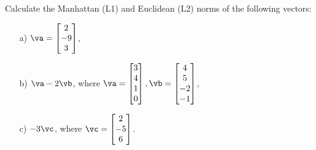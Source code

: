 \newpage

\begin{problem}[2 point]
    Calculate the Manhattan (L1) and Euclidean (L2) norms of the following vectors:

    \begin{enumerate}
        \item[a) ] $\va= \begin{bmatrix} 2\\-9\\3 \end{bmatrix}$,
        
        \item[b) ] $\va-2\vb$, where $\va= \begin{bmatrix}3\\4\\1\\0\end{bmatrix}, \vb = \begin{bmatrix}4\\5\\-2\\-1\end{bmatrix}$,
        
        \item[c) ] $-3\vc$, where $\vc= \begin{bmatrix}2\\-5\\6\end{bmatrix}$.
    \end{enumerate}

\end{problem}

